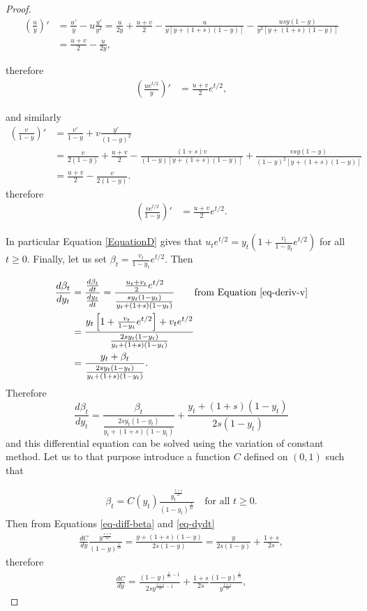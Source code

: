 \documentclass[11pt]{article}
\theoremstyle{remark}
\numberwithin{equation}{section}
\begin{document}
\begin{proof}
\begin{align*}
    \left(\frac{u}{y}\right)'&=\frac{u'}{y}-u\frac{y'}{y^2}=\frac{u}{2y}+\frac{u+v}{2}-\frac{u}{y[y+(1+s)(1-y)]}-\frac{usy(1-y)}{y^2[y+(1+s)(1-y)]}\\&=\frac{u+v}{2}-\frac{u}{2y},
\end{align*}

therefore \begin{align*}
    \left(\frac{ue^{t/2}}{y}\right)'&=\frac{u+v}{2}e^{t/2},
\end{align*}

and similarly
\begin{align*}
    \left(\frac{v}{1-y}\right)'&=\frac{v'}{1-y}+v\frac{y'}{(1-y)^2}\\&=\frac{v}{2(1-y)}+\frac{u+v}{2}-\frac{(1+s) v}{(1-y)[y+(1+s)(1-y)]}+\frac{vsy(1-y)}{(1-y)^2[y+(1+s)(1-y)]}\\&=\frac{u+v}{2}-\frac{v}{2(1-y)}.
\end{align*}
therefore 
\begin{align}\label{eq-deriv-v}
    \left(\frac{ve^{t/2}}{1-y}\right)'&=\frac{u+v}{2}e^{t/2}.
\end{align}

In particular Equation \eqref{EquationD} gives that $u_te^{t/2}=y_t\left(1+\frac{v_t}{1-y_t}e^{t/2}\right)$ for all $t\geq0$. Finally, let us set $\beta_t=\frac{v_t}{1-y_t}e^{t/2}$. Then

\begin{align*}\frac{d\beta_t}{dy_t}&=\frac{\frac{d\beta_t}{dt}}{\frac{dy_t}{dt}}=\frac{\frac{u_t+v_t}{2}e^{t/2}}{\frac{sy_t(1-y_t)}{y_t+(1+s)(1-y_t)}} \qquad\text{from Equation \eqref{eq-deriv-v}}\\&=\frac{y_t\left[1+\frac{v_t}{1-y_t}e^{t/2}\right]+v_te^{t/2}}{\frac{2sy_t(1-y_t)}{y_t+(1+s)(1-y_t)}}\\&=\frac{y_t+\beta_t}{\frac{2sy_t(1-y_t)}{y_t+(1+s)(1-y_t)}}.\end{align*}
Therefore \begin{equation}\label{eq-diff-beta}\frac{d\beta_t}{dy_t}=\frac{\beta_t}{\frac{2sy_t(1-y_t)}{y_t+(1+s)(1-y_t)}}+\frac{y_t+(1+s)(1-y_t)}{2s(1-y_t)}\end{equation} 
and this differential equation can be solved using the variation of constant method. Let us to that purpose introduce a function $C$ defined on $(0,1)$ such that

\begin{align*}\beta_t=C(y_t)\frac{y_t^{\frac{1+s}{2s}}}{(1-y_t)^{\frac{1}{2s}}}\quad\text{for all $t\geq0$}.\end{align*}
Then from Equations \eqref{eq-diff-beta} and \eqref{eq-dydt}
\begin{align*}\frac{dC}{dy}\frac{y^{\frac{1+s}{2s}}}{(1-y)^{\frac{1}{2s}}}=\frac{y+(1+s)(1-y)}{2s(1-y)}=\frac{y}{2s(1-y)}+\frac{1+s}{2s},\end{align*} therefore
\begin{align*}\frac{dC}{dy}=\frac{(1-y)^{\frac{1}{2s}-1}}{2sy^{\frac{1+s}{2s}-1}}+\frac{1+s}{2s}\frac{(1-y)^{\frac{1}{2s}}}{y^{\frac{1+s}{2s}}},\end{align*}


\end{proof}
\end{document}
